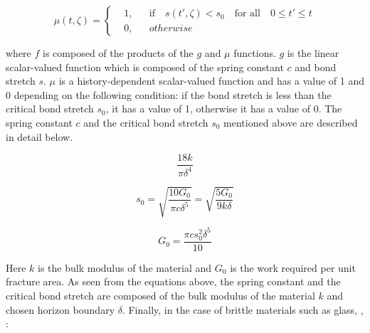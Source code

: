 \begin{equation}
  \mu(t,\zeta) = \left \{
  \begin{aligned}
    &1, && \textrm{if} \quad s(t',\zeta)<s_0 \quad \textrm{for all} \quad 0 \leq t' \leq t\\
    &0, && otherwise
  \end{aligned} \right.
\end{equation}


\noindent where $f$ is composed of the products of the $g$ and $\mu$ functions. $g$ is the linear scalar-valued function which is composed of the spring constant $c$ and bond stretch $s$. $\mu$ is a history-dependent scalar-valued function and has a value of 1 and 0 depending on the following condition: if the bond stretch is less than the critical bond stretch $s_0$, it has a value of 1, otherwise it has a value of 0. The spring constant $c$ and the critical bond stretch $s_0$ mentioned above are described in detail below.

 \begin{equation}
\frac{18k}{\pi\delta^4}
\end{equation}

 \begin{equation}
s_0=\sqrt{\frac{10G_0}{\pi c\delta^5}}=\sqrt{\frac{5G_0}{9 k\delta}}
\end{equation}

 \begin{equation}
G_0=\frac{\pi cs_0^2\delta^5}{10} 
\end{equation}

\noindent Here $k$ is the bulk modulus of the material and $G_0$ is the work required {} per unit fracture area. As seen from the equations above, the spring constant and the critical bond stretch are composed of the bulk modulus of the material $k$ and chosen horizon boundary $\delta$. Finally, in the case of brittle materials such as glass, {}, {}:

